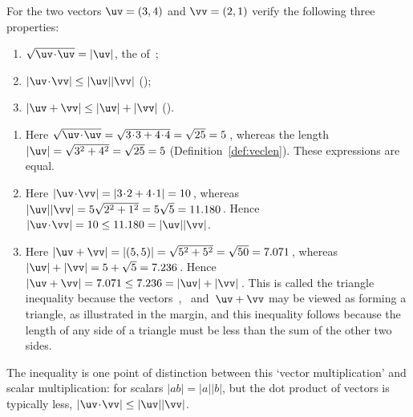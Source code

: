 \begin{example} \label{eg:triscal}
For the two vectors \(\uv=(3,4)\) and \(\vv=(2,1)\) verify the following three properties: 
\begin{enumerate}
\item \(\sqrt{\uv\cdot\uv}=|\uv|\), the  of~\uv;
\item \(|\uv\cdot\vv|\leq|\uv||\vv|\) ();
\item \(|\uv+\vv|\leq|\uv|+|\vv|\) ().
\end{enumerate}

\begin{solution} 
\begin{enumerate}
\item Here \(\sqrt{\uv\cdot\uv}=\sqrt{3\cdot3+4\cdot4}=\sqrt{25}=5\)\,, whereas the length \(|\uv|=\sqrt{3^2+4^2}=\sqrt{25}=5\) (Definition~\ref{def:veclen}). These expressions are equal.

\item Here \(|\uv\cdot\vv|=|3\cdot2+4\cdot1|=10\)\,, whereas  \(|\uv||\vv|=5\sqrt{2^2+1^2}=5\sqrt5=11.180\)\,.  
Hence \(|\uv\cdot\vv|=10\leq11.180=|\uv||\vv|\).

\item Here \(|\uv+\vv|=|(5,5)|=\sqrt{5^2+5^2}=\sqrt{50}=7.071\)\,, whereas \(|\uv|+|\vv|=5+\sqrt5=7.236\)\,.
Hence \(|\uv+\vv|=7.071\leq7.236=|\uv|+|\vv|\)\,.
This is called the triangle inequality because the vectors~\uv, \vv\ and~\(\uv+\vv\) may be viewed as forming a triangle, as illustrated in the margin, and this inequality follows because the length of any side  of a triangle must be less than the sum of the other two sides.
\end{enumerate}
\end{solution}
\end{example}


The  inequality is one point of distinction between this `vector multiplication' and scalar multiplication: for scalars \(|ab|=|a||b|\), but the dot product of vectors is typically less, \(|\uv\cdot\vv|\leq|\uv||\vv|\).

